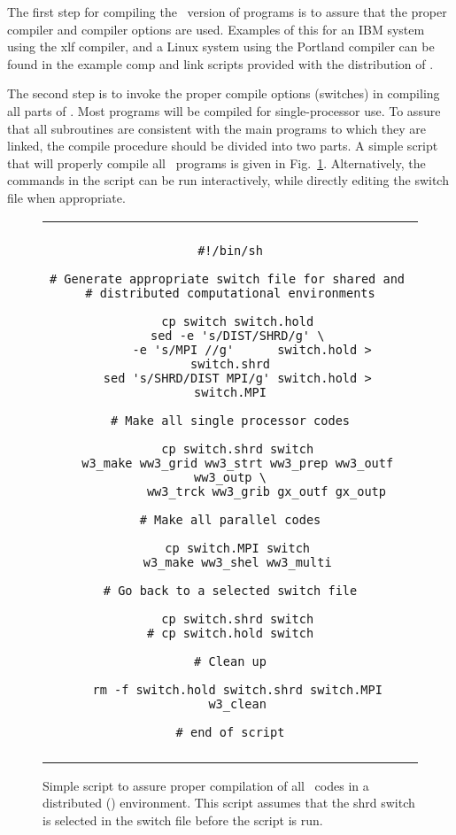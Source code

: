The first step for compiling the \mpi\ version of programs is to assure that
the proper compiler and compiler options are used. Examples of this for an IBM
system using the xlf compiler, and a Linux system using the Portland compiler
can be found in the example {\file comp} and {\file link} scripts provided
with the distribution of \ws.

The second step is to invoke the proper compile options (switches) in
compiling all parts of \ws. Most programs will be compiled for
single-processor use. To assure that all subroutines are consistent with the
main programs to which they are linked, the compile procedure should be
divided into two parts.  A simple script that will properly compile all \ws\
programs is given in Fig.~\ref{fig:make_MPI}.  Alternatively, the commands in
the script can be run interactively, while directly editing the {\file switch}
file when appropriate.

\begin{figure}
\begin{center} \begin{tabular}{|c|} \hline \\
\begin{minipage}{5in} 
\begin{verbatim}
#!/bin/sh

# Generate appropriate switch file for shared and 
# distributed computational environments

  cp switch switch.hold
  sed -e 's/DIST/SHRD/g' \
      -e 's/MPI //g'      switch.hold > switch.shrd
  sed 's/SHRD/DIST MPI/g' switch.hold > switch.MPI

# Make all single processor codes

  cp switch.shrd switch
  w3_make ww3_grid ww3_strt ww3_prep ww3_outf ww3_outp \
          ww3_trck ww3_grib gx_outf gx_outp

# Make all parallel codes

  cp switch.MPI switch
  w3_make ww3_shel ww3_multi

# Go back to a selected switch file

  cp switch.shrd switch
# cp switch.hold switch

# Clean up

  rm -f switch.hold switch.shrd switch.MPI
  w3_clean

# end of script
\end{verbatim}
\end{minipage} \\ \\ \hline
\end{tabular} \end{center}

\caption{Simple script to assure proper compilation of all \ws\ codes in a
   distributed (\mpi) environment. This script assumes that the {\F shrd}
   switch is selected in the {\file switch} file before the script is run.}
   \label{fig:make_MPI}
\end{figure}

